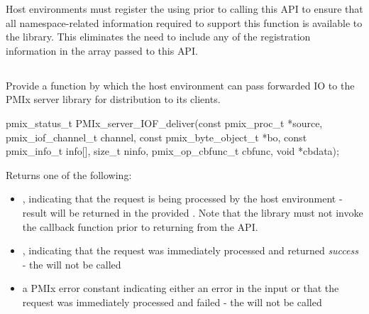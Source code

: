 Host environments must register the  using  prior to calling this \ac{API} to ensure that all namespace-related information required to support this function is available to the library. This eliminates the need to include any of the registration information in the  array passed to this \ac{API}.
\advicermend

\subsection{}

\summary

Provide a function by which the host environment can pass forwarded \ac{IO} to the \ac{PMIx} server library for distribution to its clients.

\format

\cspecificstart
\begin{codepar}
pmix_status_t
PMIx_server_IOF_deliver(const pmix_proc_t *source,
                        pmix_iof_channel_t channel,
                        const pmix_byte_object_t *bo,
                        const pmix_info_t info[], size_t ninfo,
                        pmix_op_cbfunc_t cbfunc, void *cbdata);
\end{codepar}
\cspecificend

\begin{arglist}
\end{arglist}

Returns one of the following:

\begin{itemize}
    \item {}, indicating that the request is being processed by the host environment - result will be returned in the provided . Note that the library must not invoke the callback function prior to returning from the \ac{API}.
    \item {}, indicating that the request was immediately processed and returned \textit{success} - the  will not be called
    \item a PMIx error constant indicating either an error in the input or that the request was immediately processed and failed - the  will not be called
\end{itemize}

